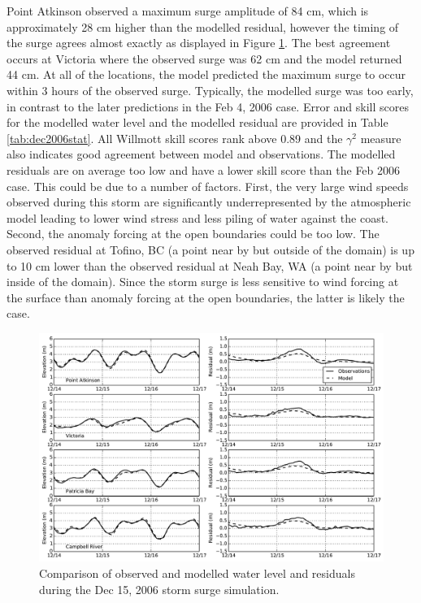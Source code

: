 \documentclass[pdftex,10pt]{article}
\begin{document}
Point Atkinson observed a maximum surge amplitude of 84 cm, which is approximately 28 cm higher than the modelled residual, however the timing of the surge agrees almost exactly as displayed in Figure \ref{fig:dec2006}. The best agreement occurs at Victoria where the observed surge was 62 cm and the model returned 44 cm. At all of the locations, the model predicted the maximum surge to occur within 3 hours of the observed surge. Typically, the modelled surge was too early, in contrast to the later predictions in the Feb 4, 2006 case. Error and skill scores for the modelled water level and the modelled residual are provided in Table \ref{tab:dec2006stat}. All Willmott skill scores rank above 0.89 and the $\gamma^2$ measure also indicates good agreement between model and observations. The modelled residuals are on average too low and have a lower skill score than the Feb 2006 case. This could be due to a number of factors. First, the very large wind speeds observed during this storm are significantly underrepresented by the atmospheric model leading to lower wind stress and less piling of water against the coast. Second, the anomaly forcing at the open boundaries could be too low. The observed residual at Tofino, BC (a point near by but outside of the domain) is up to 10 cm lower than the observed residual at Neah Bay, WA (a point near by but inside of the domain). Since the storm surge is less sensitive to wind forcing at the surface than anomaly forcing at the open boundaries, the latter is likely the case. 

\begin{figure}
\centering
\includegraphics[scale=0.6]{Figures/dec2006.pdf}
\caption{Comparison of observed and modelled water level and residuals during the Dec 15, 2006 storm surge simulation. }
\label{fig:dec2006}
\end{figure}%
\end{document}
